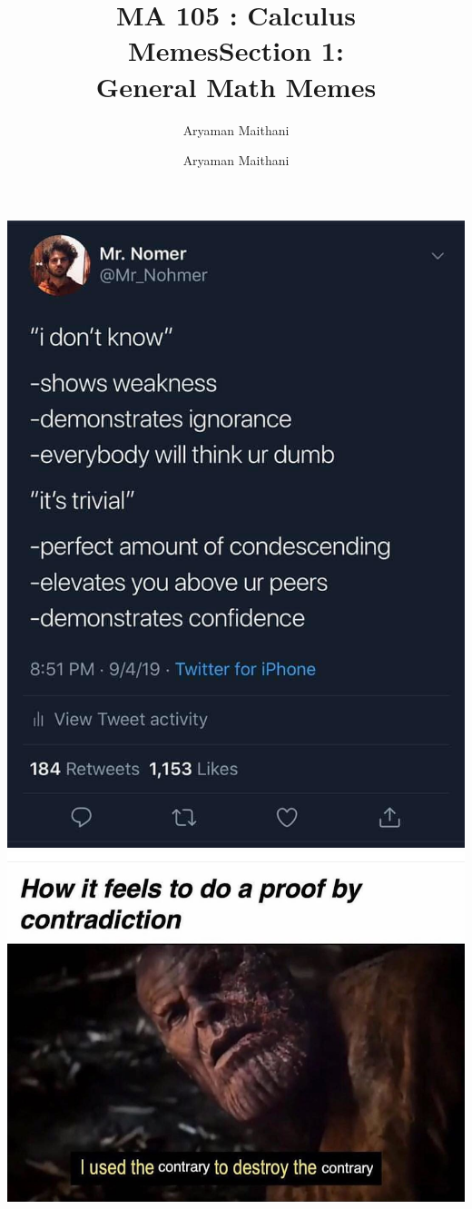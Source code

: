\documentclass[handout, aspectratio=169]{beamer}
\title{MA 105 : Calculus\\ Memes}  %
\author{Aryaman Maithani}
\date{ }
\begin{document}
\begin{frame}
	\titlepage
\end{frame}
\title{Section 1:\\ General Math Memes}
\author{ }
\begin{frame}
	\titlepage
\end{frame}
	\author{Aryaman Maithani}
\begin{frame} 
	\begin{center}
	\includegraphics[width=5 cm]{5.jpg}
	\includegraphics[width=5 cm]{20.png}
	\end{center}
\end{frame}
\end{document}
